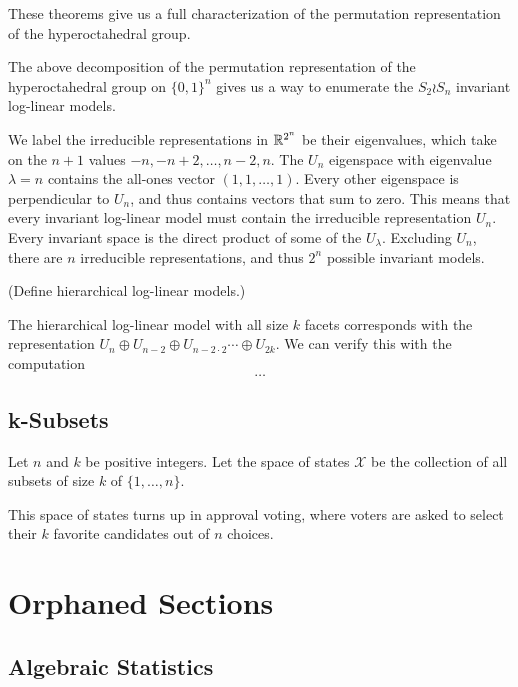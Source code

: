 \documentclass[cclicense]{hmcthesis}
\providecommand*{\xs}{\mathcal X}
\numberwithin{equation}{chapter}
\numberwithin{thmcounter}{chapter}
\begin{document}
    These theorems give us a full characterization of the permutation
    representation of the hyperoctahedral group.

    The above decomposition of the permutation representation of the
    hyperoctahedral group on $\{0, 1\}^n$ gives us a way to enumerate the $S_2
    \wr S_n$ invariant log-linear models.

    We label the irreducible representations in $\mathbb{R}^{2^n}$ be their eigenvalues,
    which take on the $n+1$ values $-n, -n + 2, \ldots, n - 2, n$.  The
    $U_n$ eigenspace with eigenvalue $\lambda = n$ contains the all-ones vector $(1,1,
    \ldots, 1)$.  Every other eigenspace is perpendicular to $U_n$, and thus
    contains vectors that sum to zero.  This means that every invariant
    log-linear model must contain the irreducible representation $U_n$.  Every
    invariant space is the direct product of some of the $U_\lambda$.  Excluding
    $U_n$, there are $n$ irreducible representations, and thus $2^n$ possible
    invariant models.

    (Define hierarchical log-linear models.)

    The hierarchical log-linear model with all size $k$ facets corresponds with
    the representation $U_n \oplus U_{n-2} \oplus U_{n-2\cdot2}\cdots \oplus U_{2k}$.
    We can verify this with the computation
    \[
        \ldots
    \]

\section{k-Subsets}

    Let $n$ and $k$ be positive integers.  Let the space of states $\xs$ be the
    collection of all subsets of size $k$ of $\{1, \ldots, n\}$.

    This space of states turns up in approval voting, where voters are asked to
    select their $k$ favorite candidates out of $n$ choices.



\appendix



\chapter{Orphaned Sections}

\section{Algebraic Statistics}
\end{document}
